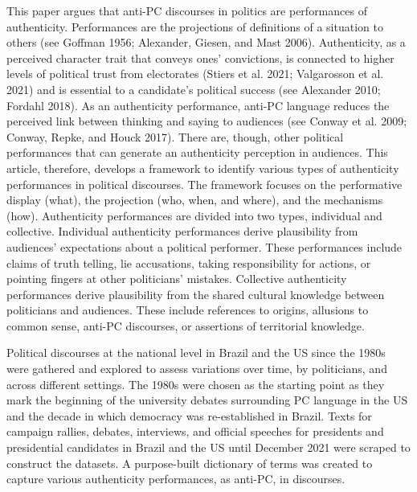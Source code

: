 \documentclass[smallextended]{svjour3}       %
\begin{document}
This paper argues that anti-PC discourses in politics are performances
of authenticity. Performances are the projections of definitions of a
situation to others (see Goffman 1956; Alexander, Giesen, and Mast
2006). Authenticity, as a perceived character trait that conveys ones'
convictions, is connected to higher levels of political trust from
electorates (Stiers et al. 2021; Valgarosson et al. 2021) and is
essential to a candidate's political success (see Alexander 2010;
Fordahl 2018). As an authenticity performance, anti-PC language reduces
the perceived link between thinking and saying to audiences (see Conway
et al. 2009; Conway, Repke, and Houck 2017). There are, though, other
political performances that can generate an authenticity perception in
audiences. This article, therefore, develops a framework to identify
various types of authenticity performances in political discourses. The
framework focuses on the performative display (what), the projection
(who, when, and where), and the mechanisms (how). Authenticity
performances are divided into two types, individual and collective.
Individual authenticity performances derive plausibility from audiences'
expectations about a political performer. These performances include
claims of truth telling, lie accusations, taking responsibility for
actions, or pointing fingers at other politicians' mistakes. Collective
authenticity performances derive plausibility from the shared cultural
knowledge between politicians and audiences. These include references to
origins, allusions to common sense, anti-PC discourses, or assertions of
territorial knowledge.

Political discourses at the national level in Brazil and the US since
the 1980s were gathered and explored to assess variations over time, by
politicians, and across different settings. The 1980s were chosen as the
starting point as they mark the beginning of the university debates
surrounding PC language in the US and the decade in which democracy was
re-established in Brazil. Texts for campaign rallies, debates,
interviews, and official speeches for presidents and presidential
candidates in Brazil and the US until December 2021 were scraped to
construct the datasets. A purpose-built dictionary of terms was created
to capture various authenticity performances, as anti-PC, in discourses.
\end{document}
